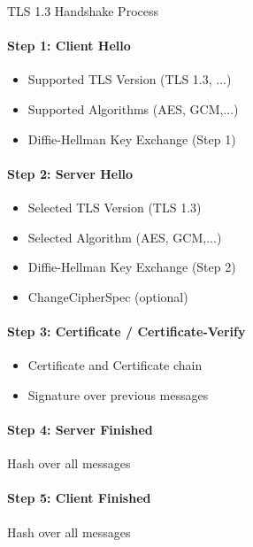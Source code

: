 \begin{KR}{TLS 1.3 Handshake Process}\\
    \paragraph{Step 1: Client Hello}
    \begin{itemize}
        \item Supported TLS Version (TLS 1.3, ...)
        \item Supported Algorithms (AES, GCM,...)
        \item Diffie-Hellman Key Exchange (Step 1)
    \end{itemize}
    
    \paragraph{Step 2: Server Hello}
    \begin{itemize}
        \item Selected TLS Version (TLS 1.3)
        \item Selected Algorithm (AES, GCM,...)
        \item Diffie-Hellman Key Exchange (Step 2)
        \item ChangeCipherSpec (optional)
    \end{itemize}
    
    \paragraph{Step 3: Certificate / Certificate-Verify}
    \begin{itemize}
        \item Certificate and Certificate chain
        \item Signature over previous messages
    \end{itemize}
    
    \paragraph{Step 4: Server Finished}
    Hash over all messages
    
    \paragraph{Step 5: Client Finished}
    Hash over all messages
\end{KR}

